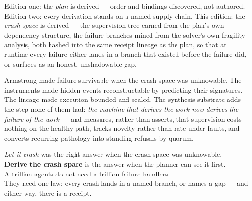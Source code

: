 \documentclass[11pt,a4paper]{article}
\theoremstyle{definition}
\theoremstyle{remark}
\begin{document}
Edition one: the \emph{plan} is derived --- order and bindings discovered,
not authored. Edition two: every derivation stands on a named supply
chain. This edition: the \emph{crash space} is derived --- the supervision
tree earned from the plan's own dependency structure, the failure branches
mined from the solver's own fragility analysis, both hashed into the same
receipt lineage as the plan, so that at runtime every failure either lands
in a branch that existed before the failure did, or surfaces as an honest,
unshadowable gap.

Armstrong made failure survivable when the crash space was unknowable.
The instruments made hidden events reconstructable by predicting their
signatures. The lineage made execution bounded and sealed. The synthesis
substrate adds the step none of them had: \emph{the machine that derives
the work now derives the failure of the work} --- and measures, rather
than asserts, that supervision costs nothing on the healthy path, tracks
novelty rather than rate under faults, and converts recurring pathology
into standing refusals by quorum.

\begin{center}
\emph{Let it crash} was the right answer when the crash space was
unknowable.\\
\textbf{Derive the crash space} is the answer when the planner can see it
first.\\[0.5em]
A trillion agents do not need a trillion failure handlers.\\
They need one law: every crash lands in a named branch, or names a gap ---
and either way, there is a receipt.
\end{center}
\end{document}
